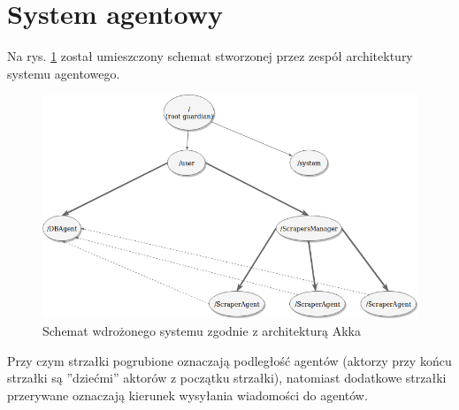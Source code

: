 \section{System agentowy}
Na rys. \ref{fig:actor} został umieszczony schemat stworzonej przez zespół architektury systemu agentowego.
\begin{figure}[!htb]
\centering
\includegraphics[width=1.0\textwidth]{./pict/actors.png}
\caption{Schemat wdrożonego systemu zgodnie z architekturą Akka}
\label{fig:actor}
\end{figure}

\par Przy czym strzałki pogrubione oznaczają podległość agentów (aktorzy przy końcu strzałki są ''dziećmi'' aktorów z początku strzałki), natomiast dodatkowe strzałki przerywane oznaczają kierunek wysyłania wiadomości do agentów.

